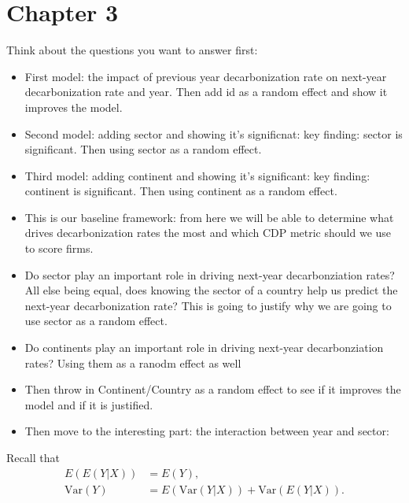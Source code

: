 \chapter{Chapter 3}

Think about the questions you want to answer first:
\begin{itemize}
    \item First model: the impact of previous year decarbonization rate on next-year decarbonization rate and year. Then add id as a random effect and show it improves the model.
    \item Second model: adding sector and showing it's significnat: key finding: sector is significant. Then using sector as a random effect.
    \item Third model: adding continent and showing it's significant: key finding: continent is significant. Then using continent as a random effect.
    \item This is our baseline framework: from here we will be able to determine what drives decarbonization rates the most and which CDP metric should we use to score firms.
    \item Do sector play an important role in driving next-year decarbonziation rates? All else being equal, does knowing the sector of a country help us predict the next-year decarbonization rate? This is going to justify why we are going to use sector as a random effect. 
    \item Do continents play an important role in driving next-year decarbonziation rates? Using them as a ranodm effect as well
    \item Then throw in Continent/Country as a random effect to see if it improves the model and if it is justified.
    \item Then move to the interesting part: the interaction between year and sector: 
\end{itemize}

Recall that 
\begin{align*} 
   E(E(Y|X)) &= E(Y), \\
    \textrm{Var}(Y) &= E(\textrm{Var}(Y|X)) + \textrm{Var}(E(Y|X)). \\
\end{align*}



